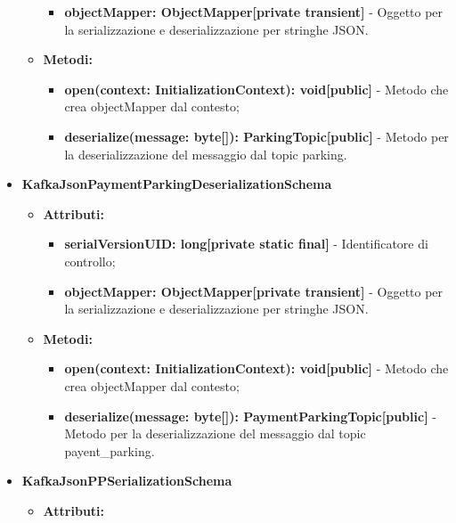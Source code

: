 \documentclass[8pt]{article}
\begin{document}
\begin{itemize}
\begin{itemize}
\begin{itemize}
            \item \textbf{objectMapper: ObjectMapper[private transient]} - Oggetto per la serializzazione e deserializzazione per stringhe JSON.
        \end{itemize}
    \end{itemize}
    \begin{itemize}
        \item \textbf{Metodi:}
        \begin{itemize}
            \item \textbf{open(context: InitializationContext): void[public]} - Metodo che crea objectMapper dal contesto;
            \item \textbf{deserialize(message: byte[]): ParkingTopic[public]} - Metodo per la deserializzazione del messaggio dal topic parking.
        \end{itemize}
    \end{itemize}
    \item \textbf{KafkaJsonPaymentParkingDeserializationSchema}
    \begin{itemize}
        \item \textbf{Attributi:}
        \begin{itemize}
            \item \textbf{serialVersionUID: long[private static final]} - Identificatore di controllo;
            \item \textbf{objectMapper: ObjectMapper[private transient]} - Oggetto per la serializzazione e deserializzazione per stringhe JSON.
        \end{itemize}
    \end{itemize}
    \begin{itemize}
        \item \textbf{Metodi:}
        \begin{itemize}
            \item \textbf{open(context: InitializationContext): void[public]} - Metodo che crea objectMapper dal contesto;
            \item \textbf{deserialize(message: byte[]): PaymentParkingTopic[public]} - Metodo per la deserializzazione del messaggio dal topic payent\_parking.
        \end{itemize}
    \end{itemize}
    \item \textbf{KafkaJsonPPSerializationSchema}
    \begin{itemize}
        \item \textbf{Attributi:}

\end{itemize}
\end{itemize}
\end{document}
